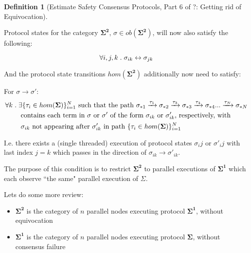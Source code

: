 \documentclass{article}
\theoremstyle{definition}
\newtheorem{defn}{Definition}[section]
\newcommand{\cat}{
	\mathbf
}
\begin{document}
\begin{defn}[Estimate Safety Consensus Protocols, Part 6 of ?: Getting rid of Equivocation]
\begin{description}


Protocol states for the category $\cat{\Sigma^2}$, $\sigma \in ob(\cat{\Sigma^2})$, will now also satisfy the following:

$$
\forall i,j,k \hspace{1mm} . \hspace{1mm} \sigma_{ik} \leftrightarrow \sigma_{jk}
$$

And the protocol state transitions $hom(\cat{\Sigma^2})$ additionally now need to satisfy:

For $\sigma \to \sigma'$:
\begin{align*}
  \forall k \hspace{1mm} . \hspace{1mm} &\exists \{\tau_i \in hom(\cat{\Sigma})\}_{i=1}^N \text{ such that the path } \sigma_{*1} \xrightarrow[]{\tau_1} \sigma_{*2} \xrightarrow[]{\tau_3} \sigma_{*3} \xrightarrow[]{\tau_4} \sigma_{*4}... \xrightarrow[]{\tau_N} \sigma_{*N} \\
  &\text{ contains each term in $\sigma$ or $\sigma'$ of the form $\sigma_{ik}$ or $\sigma'_{ik}$, respectively, with} \\
  &\text{ $\sigma_{ik}$ not appearing after $\sigma'_{ik}$ in path $\{\tau_i \in hom(\cat{\Sigma})\}_{i=1}^N$ }
\end{align*}

I.e. there exists a (single threaded) execution of protocol states $\sigma_ij$ or $\sigma'_ij$ with last index $j = k$ which passes in the direction of $\sigma_{ik} \to \sigma'_{ik}$.

The purpose of this condition is to restrict $\cat{\Sigma^2}$ to parallel executions of $\cat{\Sigma^1}$ which each observe ``the same" parallel execution of $\Sigma$.
\end{description}
\end{defn}

Lets do some more review:

\begin{itemize}
\item $\cat{\Sigma^2}$ is the category of $n$ parallel nodes executing protocol $\cat{\Sigma^1}$, without equivocation
\item $\cat{\Sigma^1}$ is the category of $n$ parallel nodes executing protocol $\cat{\Sigma}$, without consensus failure
\end{itemize}
\end{document}
